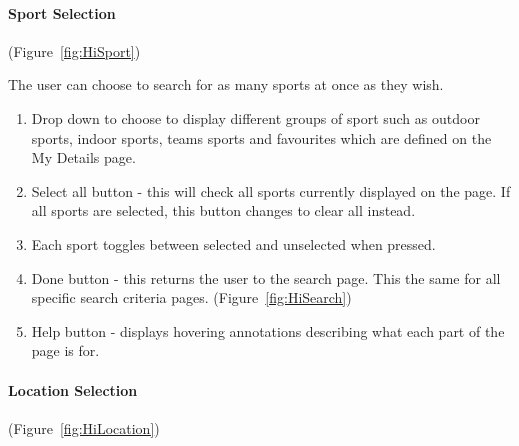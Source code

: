 \paragraph{Sport Selection}

(Figure~\ref{fig:HiSport})


The user can choose to search for as many sports at once as they wish. 
\begin{enumerate}
	\item Drop down to choose to display different groups of sport such as outdoor
	      sports, indoor sports, teams sports and favourites which are defined
	      on the My Details page.
	\item Select all button - this will check all sports currently displayed
	      on the page. If all sports are selected, this button changes to clear
	      all instead.
	\item Each sport toggles between selected and unselected when pressed.
	\item Done button - this returns the user to the search page. This the same
	      for all specific search criteria pages. (Figure~\ref{fig:HiSearch})
	\item Help button - displays hovering annotations describing what each part
	      of the page is for.
\end{enumerate}

\paragraph{Location Selection}

(Figure~\ref{fig:HiLocation})


